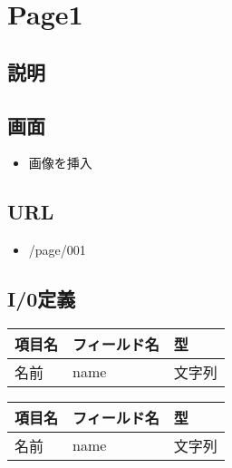 \documentclass[letterpaper,10pt,dvipdfmx]{sphinxmanual}
\begin{document}
\chapter{Page1}
\label{\detokenize{page_001:page1}}\label{\detokenize{page_001::doc}}

\section{説明}
\label{\detokenize{page_001:id1}}

\section{画面}
\label{\detokenize{page_001:id2}}\begin{itemize}
\item {} 
画像を挿入

\end{itemize}


\section{URL}
\label{\detokenize{page_001:url}}\begin{itemize}
\item {} 
/page/001

\end{itemize}


\section{I/0定義}
\label{\detokenize{page_001:i-0}}


\begin{savenotes}\sphinxattablestart
\centering
\begin{tabulary}{\linewidth}[t]{|T|T|T|}
\hline
\sphinxstyletheadfamily 
項目名
&\sphinxstyletheadfamily 
フィールド名
&\sphinxstyletheadfamily 
型
\\
\hline
名前
&
name
&
文字列
\\
\hline
\end{tabulary}
\par
\sphinxattableend\end{savenotes}



\begin{savenotes}\sphinxattablestart
\centering
\begin{tabulary}{\linewidth}[t]{|T|T|T|}
\hline
\sphinxstyletheadfamily 
項目名
&\sphinxstyletheadfamily 
フィールド名
&\sphinxstyletheadfamily 
型
\\
\hline
名前
&
name
&
文字列
\\
\hline
\end{tabulary}
\par
\sphinxattableend\end{savenotes}
\end{document}
